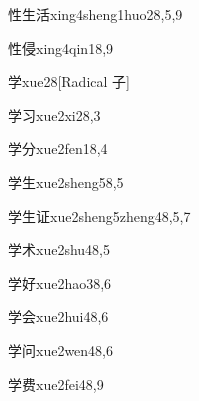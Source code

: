 \begin{verbete}{性生活}{xing4sheng1huo2}{8,5,9}
\end{verbete}

\begin{verbete}{性侵}{xing4qin1}{8,9}
\end{verbete}

\begin{verbete}{学}{xue2}{8}[Radical 子]
\end{verbete}

\begin{verbete}{学习}{xue2xi2}{8,3}
\end{verbete}

\begin{verbete}{学分}{xue2fen1}{8,4}
\end{verbete}

\begin{verbete}{学生}{xue2sheng5}{8,5}
\end{verbete}

\begin{verbete}{学生证}{xue2sheng5zheng4}{8,5,7}
\end{verbete}

\begin{verbete}{学术}{xue2shu4}{8,5}
\end{verbete}

\begin{verbete}{学好}{xue2hao3}{8,6}
\end{verbete}

\begin{verbete}{学会}{xue2hui4}{8,6}
\end{verbete}

\begin{verbete}{学问}{xue2wen4}{8,6}
\end{verbete}

\begin{verbete}{学费}{xue2fei4}{8,9}
\end{verbete}

